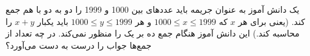 \p
    یک دانش آموز به عنوان جریمه باید عدد‌های بین 1000 و 1999 را دو به دو با هم جمع کند. (یعنی برای هر 
	$x$
	که
	$1000 \leq x \leq 1999$
	و هر
	$1000 \leq y \leq 1999$
	باید یکبار $x + y$ 
	را محاسبه کند.) این دانش آموز هنگام جمع ده بر یک را منظور نمی‌کند. در چه تعداد از جمع‌ها جواب را درست به دست می‌آورد؟